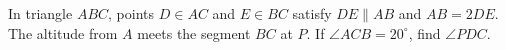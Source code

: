 In triangle $ABC$, points $D\in AC$ and $E\in BC$ satisfy $DE\parallel AB$ and $AB=2DE$. The altitude from $A$ meets the segment $BC$ at $P$. If $\angle ACB=20^\circ$, find $\angle PDC$.
